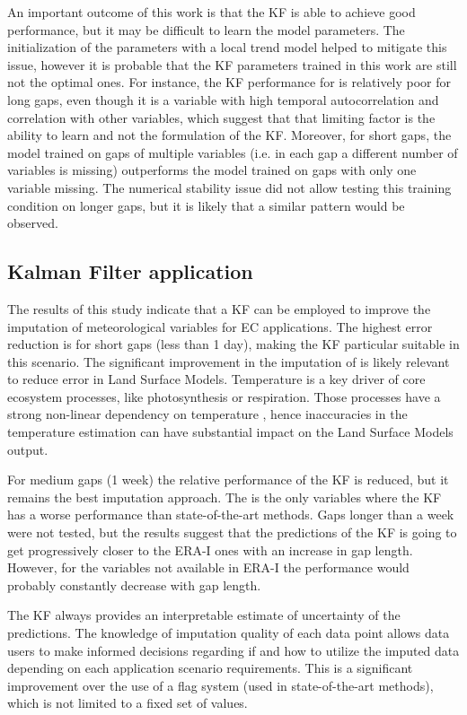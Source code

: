 \documentclass{article}
\let\Oldsubsection\subsection
\renewcommand{\subsection}{\FloatBarrier\Oldsubsection}
\begin{document}
An important outcome of this work is that the KF is able to achieve good performance, but it may be difficult to learn the model parameters. The initialization of the parameters with a local trend model helped to mitigate this issue, however it is probable that the KF parameters trained in this work are still not the optimal ones. For instance, the KF performance for  is relatively poor for long gaps, even though it is a variable with high temporal autocorrelation and correlation with other variables, which suggest that that limiting factor is the ability to learn and not the formulation of the KF. Moreover, for short gaps, the model trained on gaps of multiple variables (i.e. in each gap a different number of variables is missing) outperforms the model trained on gaps with only one variable missing. The numerical stability issue did not allow testing this training condition on longer gaps, but it is likely that a similar pattern would be observed.


\subsection{Kalman Filter application}

The results of this study indicate that a KF can be employed to improve the imputation of meteorological variables for EC applications.
The highest error reduction is for short gaps (less than 1 day), making the KF particular suitable in this scenario. The significant improvement in the imputation of  is likely relevant to reduce error in Land Surface Models. Temperature is a key driver of core ecosystem processes, like photosynthesis or respiration. Those processes have a strong non-linear dependency on temperature \cite{bonan_climate_2019-2}, hence inaccuracies in the temperature estimation can have substantial impact on the Land Surface Models output.

For medium gaps (1 week) the relative performance of the KF is reduced, but it remains the best imputation approach. The  is the only variables where the KF has a worse performance than state-of-the-art methods.
Gaps longer than a week were not tested, but the results suggest that the predictions of the KF is going to get progressively closer to the ERA-I ones with an increase in gap length. However, for the variables not available in ERA-I the performance would probably constantly decrease with gap length.

The KF always provides an interpretable estimate of uncertainty of the predictions. The knowledge of imputation quality of each data point allows data users to make informed decisions regarding if and how to utilize the imputed data depending on each application scenario requirements.
This is a significant improvement over the use of a flag system (used in state-of-the-art methods), which is not limited to a fixed set of values.
\end{document}
